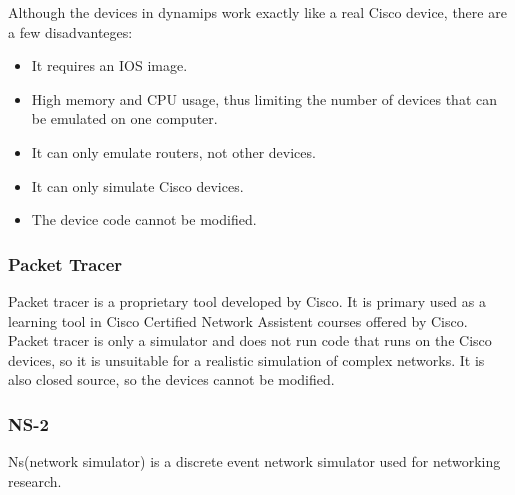 Although the devices in dynamips work exactly like a real Cisco device, there are a few disadvanteges:
\begin{itemize}
  \item It requires an IOS image.
  \item High memory and CPU usage, thus limiting the number of devices that can be emulated on one computer.
  \item It can only emulate routers, not other devices.
  \item It can only simulate Cisco devices.
  \item The device code cannot be modified.
\end{itemize}

\subsubsection{Packet Tracer}

Packet tracer is a proprietary tool developed by Cisco. It is primary used as a learning tool
in Cisco Certified Network Assistent courses offered by Cisco.
Packet tracer is only a simulator and does not run code that runs on the Cisco devices, so
it is unsuitable for a realistic simulation of complex networks. It is also closed source, so
the devices cannot be modified.


\subsubsection{NS-2}
Ns(network simulator) is a discrete event network simulator used for networking research.
